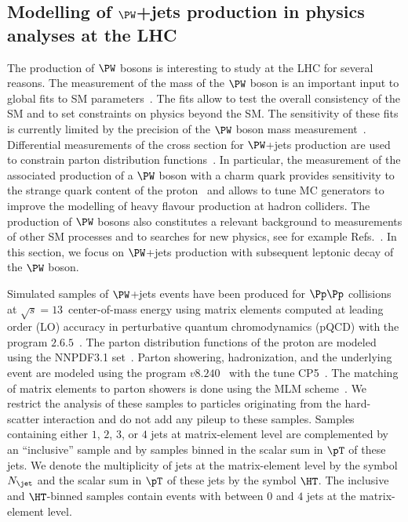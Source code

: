 \subsection{Modelling of \texorpdfstring{$\PW$}{W}+jets production in physics analyses at the LHC}
\label{sec:examples_background_yield}

The production of $\PW$ bosons is interesting to study at the LHC for several reasons.
The measurement of the mass of the $\PW$ boson is an important input to global fits to SM parameters~\cite{Baak:2014ora}.
The fits allow to test the overall consistency of the SM and to set constraints on physics beyond the SM.
The sensitivity of these fits is currently limited by the precision of the $\PW$ boson mass measurement~\cite{Baak:2014ora}.
Differential measurements of the cross section for $\PW$+jets production 
are used to constrain parton distribution functions~\cite{CMS:2016qqr,ATLAS:2016nqi,ATLAS:2019fgb,CMS:2020cph}.
In particular, the measurement of the associated production of a $\PW$ boson with a charm quark
provides sensitivity to the strange quark content of the proton~\cite{CMS:2013wql,ATLAS:2014jkm,CMS:2018dxg} 
and allows to tune MC generators to improve the modelling of heavy flavour production at hadron colliders.
The production of $\PW$ bosons also constitutes a relevant background to measurements of other SM processes
and to searches for new physics, see for example Refs.~\cite{ATLAS:2014aga,Aad:2019yxi,CMS-HIG-13-027,CMS-HIG-17-006}.
In this section, we focus on $\PW$+jets production with subsequent leptonic decay of the $\PW$ boson.

Simulated samples of $\PW$+jets events have been produced for $\Pp\Pp$ collisions at $\sqrt{s}=13$~\TeV center-of-mass energy
using matrix elements computed at leading order (LO) accuracy in perturbative quantum chromodynamics (pQCD)
with the program \MGvATNLO $2.6.5$~\cite{MGvATNLO}.
The parton distribution functions of the proton are modeled using the NNPDF3.1 set~\cite{NNPDF:2017mvq}.
Parton showering, hadronization, and the underlying event are modeled using the program \PYTHIA $v8.240$~\cite{PYTHIA} with the tune \textrm{CP5}~\cite{Sirunyan:2019dfx}.
The matching of matrix elements to parton showers is done using the \textrm{MLM} scheme~\cite{Alwall:2007fs}.
We restrict the analysis of these samples to particles originating from the hard-scatter interaction and do not add any pileup to these samples.
Samples containing either $1$, $2$, $3$, or $4$ jets at matrix-element level are complemented by an ``inclusive'' sample 
and by samples binned in the scalar sum in $\pT$ of these jets.
We denote the multiplicity of jets at the matrix-element level by the symbol $N_{\jet}$ and the scalar sum in $\pT$ of these jets by the symbol $\HT$.
The inclusive and $\HT$-binned samples contain events with between $0$ and $4$ jets at the matrix-element level.

